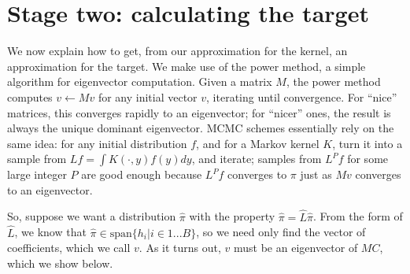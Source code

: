 \documentclass{article}
\newcommand\EMK[1]{\textcolor{purple}{EMK: #1}}
\begin{document}
\section{Stage two: calculating the target}
\label{BEMC-target}
We now explain how to get, from our approximation for the kernel, an approximation for the target. We make use of the power method, a simple algorithm for eigenvector computation. Given a matrix $M$, the power method computes $v\leftarrow Mv$ for any initial vector $v$, iterating until convergence. For ``nice'' matrices, this converges rapidly to an eigenvector; for ``nicer'' ones, the result is always the unique dominant eigenvector. MCMC schemes essentially rely on the same idea: for any initial distribution $f$, and for a Markov kernel $K$, turn it into a sample from $Lf=\int K(\cdot, y)f(y)dy$, and iterate; samples from $L^Pf$ for some large integer $P$ are good enough because $L^Pf$ converges to $\pi$ just as $Mv$ converges to an eigenvector. 

%
%

So, suppose we want a distribution $\hat{\pi}$ with the property $\hat{\pi}=\hat{L}\hat{\pi}$. From the form of $\hat{L}$, we know that $\hat{\pi}\in \text{span}\{h_i|i \in 1...B\}$, so we need only find the vector of coefficients, which we call $v$. As it turns out, $v$ must be an eigenvector of $MC$, which we show below. 
\end{document}
